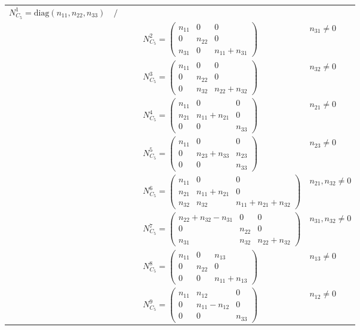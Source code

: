 \documentclass[12pt, reqno]{amsart}
\theoremstyle{plain}
\begin{document}
\begin{table}[H]
\begin{tabular}{|c|c|l|l|l|l|}
    $N_{C_5}^1 = \text{diag}(n_{11}, n_{22}, n_{33})$ & $/$ \\
    & & & & $N_{C_5}^2 = \begin{pmatrix} n_{11} & 0 & 0 \\ 0 & n_{22} & 0 \\ n_{31} & 0 & n_{11}+n_{31} \end{pmatrix}$ & $n_{31}\neq0$ \\
    & & & & $N_{C_5}^3 = \begin{pmatrix} n_{11} & 0 & 0 \\ 0 & n_{22} & 0 \\ 0 & n_{32} & n_{22}+n_{32} \end{pmatrix}$ & $n_{32}\neq0$ \\
    & & & & $N_{C_5}^4 = \begin{pmatrix} n_{11} & 0 & 0 \\ n_{21} & n_{11}+n_{21} & 0 \\ 0 & 0 & n_{33} \end{pmatrix}$ & $n_{21}\neq0$ \\
    & & & & $N_{C_5}^5 = \begin{pmatrix} n_{11} & 0 & 0 \\ 0 & n_{23}+n_{33} & n_{23} \\ 0 & 0 & n_{33} \end{pmatrix}$ & $n_{23}\neq0$ \\
    & & & & $N_{C_5}^6 = \begin{pmatrix} n_{11} & 0 & 0 \\ n_{21} & n_{11}+n_{21} & 0 \\ n_{32} & n_{32} & n_{11}+n_{21}+n_{32} \end{pmatrix}$ & $n_{21},n_{32}\neq0$ \\
    & & & & $N_{C_5}^7 = \begin{pmatrix} n_{22}+n_{32}-n_{31} & 0 & 0 \\ 0 & n_{22} & 0 \\ n_{31} & n_{32} & n_{22}+n_{32} \end{pmatrix}$ & $n_{31},n_{32}\neq0$ \\
    & & & & $N_{C_5}^8 = \begin{pmatrix} n_{11} & 0 & n_{13} \\ 0 & n_{22} & 0 \\ 0 & 0 & n_{11}+n_{13} \end{pmatrix}$ & $n_{13}\neq0$ \\
    & & & & $N_{C_5}^9 = \begin{pmatrix} n_{11} & n_{12} & 0 \\ 0 & n_{11}-n_{12} & 0 \\ 0 & 0 & n_{33} \end{pmatrix}$ & $n_{12}\neq0$ \\

\end{tabular}
\end{table}
\end{document}
